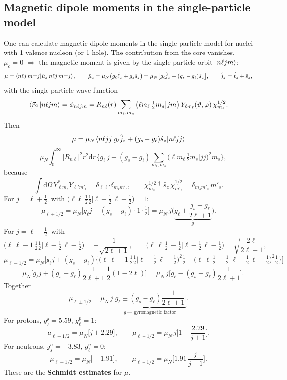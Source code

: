 \documentclass[11pt,a4paper]{article}
\newcommand{\op}[1]{\hat{#1}}
\newcommand{\ud}{\mathrm{d}}
\begin{document}
\subsection{Magnetic dipole moments in the single-particle model}
One can calculate magnetic dipole moments in the single-particle model for nuclei with 1 valence nucleon (or 1 hole). The contribution from the core vanishes, $\mu_c=0$ $\Rightarrow$ the magnetic moment is given by the single-particle orbit $\ket{n\ell jm}$:
\[
\mu=\braket{n\ell j\,m{=}j|\op\mu_z|n\ell j\,m{=}j},
\qquad
\op\mu_z=\mu_N\big(g_\ell\op\ell_z+g_s\op s_z\big)=\mu_N\big[g_\ell\op j_z+(g_s-g_\ell)\op s_z\big],
\qquad \op j_z=\op\ell_z+\op s_z ,
\]
with the single-particle wave function
\[
\braket{\vec r\sigma|n\ell jm}=\phi_{n\ell jm}=R_{n\ell}(r)\sum_{m_\ell,m_s}\big(\ell m_\ell\,\tfrac12 m_s\big|jm\big)\,Y_{\ell m_\ell}(\vartheta,\varphi)\,\chi^{1/2}_{m_s}.
\]
Then
\[
\mu=\mu_N\braket{n\ell jj|g_\ell\op j_z+(g_s-g_\ell)\op s_z|n\ell jj}
\]
\[
=\mu_N\int_0^\infty|R_{n\ell}|^2r^2\ud r\,\Big\{g_\ell\,j+(g_s-g_\ell)\sum_{m_\ell,m_s}\big(\ell m_\ell\,\tfrac12 m_s\big|jj\big)^2m_s\Big\},
\]
because
\[
\int\ud\Omega\,Y^*_{\ell m_\ell}Y_{\ell' m'_\ell}=\delta_{\ell\ell'}\delta_{m_\ell m'_\ell},
\qquad
\chi^{1/2\,\dagger}_{m_s}\,\op s_z\,\chi^{1/2}_{m'_s}=\delta_{m_sm'_s}\,m'_s .
\]
For $j=\ell+\frac12$, with $\big(\ell\ell\,\tfrac12\tfrac12\big|\ell{+}\tfrac12\,\ell{+}\tfrac12\big)=1$:
\[
\mu_{\ell+1/2}=\mu_N\Big[g_\ell j+(g_s-g_\ell)\cdot1\cdot\tfrac12\Big]
=\mu_N\,j\Big(\underbrace{g_\ell+\frac{g_s-g_\ell}{2\ell+1}}_{g}\Big).
\]
For $j=\ell-\frac12$, with
\[
\big(\ell\,\ell{-}1\,\tfrac12\tfrac12\big|\ell{-}\tfrac12\,\ell{-}\tfrac12\big)=-\frac{1}{\sqrt{2\ell+1}},
\qquad
\big(\ell\,\ell\,\tfrac12\,{-}\tfrac12\big|\ell{-}\tfrac12\,\ell{-}\tfrac12\big)=\sqrt{\frac{2\ell}{2\ell+1}},
\]
\[
\mu_{\ell-1/2}=\mu_N\Big[g_\ell j+(g_s-g_\ell)\Big\{\big(\ell\,\ell{-}1\,\tfrac12\tfrac12\big|\ell{-}\tfrac12\,\ell{-}\tfrac12\big)^2\tfrac12
-\big(\ell\,\ell\,\tfrac12\,{-}\tfrac12\big|\ell{-}\tfrac12\,\ell{-}\tfrac12\big)^2\tfrac12\Big\}\Big]
\]
\[
=\mu_N\Big[g_\ell j+(g_s-g_\ell)\frac{1}{2\ell+1}\,\frac12(1-2\ell)\Big]
=\mu_N\,j\Big[g_\ell-(g_s-g_\ell)\frac{1}{2\ell+1}\Big].
\]
Together
\[
\mu_{\ell\pm1/2}=\mu_N\,j\underbrace{\Big[g_\ell\pm(g_s-g_\ell)\frac{1}{2\ell+1}\Big]}_{g\ \text{--- gyromagnetic factor}} .
\]
For protons, $g_s^p=5.59$, $g_\ell^p=1$:
\[
\mu_{\ell+1/2}=\mu_N\big[j+2.29\big],\qquad
\mu_{\ell-1/2}=\mu_N\,j\Big[1-\frac{2.29}{j+1}\Big].
\]
For neutrons, $g_s^n=-3.83$, $g_\ell^n=0$:
\[
\mu_{\ell+1/2}=\mu_N\big[-1.91\big],\qquad
\mu_{\ell-1/2}=\mu_N\Big[1.91\,\frac{j}{j+1}\Big].
\]
These are the \textbf{Schmidt estimates} for $\mu$.
\end{document}
